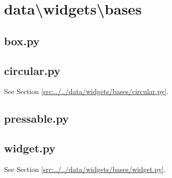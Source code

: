 \documentclass[../main/main.tex]{subfiles}
\begin{document}
\section{data\textbackslash widgets\textbackslash bases}
\subsection{box.py}

\label{src:data/widgets/bases/box.py}

\subsection{circular.py}
See Section \ref{src:../../data/widgets/bases/circular.py}.

\subsection{pressable.py}

\label{src:data/widgets/bases/pressable.py}

\subsection{widget.py}
See Section \ref{src:../../data/widgets/bases/widget.py}.
\end{document}
